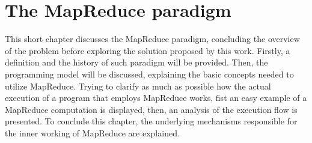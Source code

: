 \chapter{The MapReduce paradigm}
This short chapter discusses the MapReduce paradigm, concluding the overview of the problem before exploring the solution proposed by this work. Firstly, a definition and the history of such paradigm will be provided. Then, the programming model will be discussed, explaining the basic concepts needed to utilize MapReduce. Trying to clarify as much as possible how the actual execution of a program that employs MapReduce works, fist an easy example of a MapReduce computation is displayed, then, an analysis of the execution flow is presented. To conclude this chapter, the underlying mechanisms responsible for the inner working of MapReduce are explained. 





